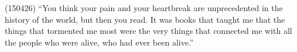 \documentclass{report}
\begin{document}
(150426)
“You think your pain and your heartbreak are unprecedented in the history of the world, but then you read. It was books that taught me that the things that tormented me most were the very things that connected me with all the people who were alive, who had ever been alive.” 
\end{document}
